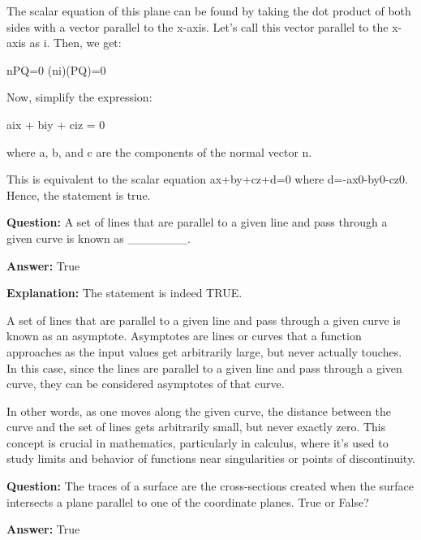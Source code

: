 \documentclass{article}
\begin{document}
The scalar equation of this plane can be found by taking the dot product of both sides with a vector parallel to the x-axis. Let's call this vector parallel to the x-axis as i. Then, we get:

n{\textperiodcentered}PQ{\textrightarrow}=0
(n{\textperiodcentered}i){\textbullet}(PQ{\textrightarrow})=0

Now, simplify the expression:

ai{\textperiodcentered}x + bi{\textperiodcentered}y + ci{\textperiodcentered}z = 0

where a, b, and c are the components of the normal vector n.

This is equivalent to the scalar equation ax+by+cz+d=0 where d=-ax0-by0-cz0. Hence, the statement is true.
                
                \vspace{0.5cm} 
        
            
                \textbf {Question:} A set of lines that are parallel to a given line and pass through a given curve is known as \_\_\_\_\_\_\_.
                
                \textbf{Answer:} True

                \textbf{Explanation:} The statement is indeed TRUE.

A set of lines that are parallel to a given line and pass through a given curve is known as an asymptote. Asymptotes are lines or curves that a function approaches as the input values get arbitrarily large, but never actually touches. In this case, since the lines are parallel to a given line and pass through a given curve, they can be considered asymptotes of that curve.

In other words, as one moves along the given curve, the distance between the curve and the set of lines gets arbitrarily small, but never exactly zero. This concept is crucial in mathematics, particularly in calculus, where it's used to study limits and behavior of functions near singularities or points of discontinuity.
                
                \vspace{0.5cm} 
        
            
                \textbf {Question:} The traces of a surface are the cross-sections created when the surface intersects a plane parallel to one of the coordinate planes. True or False?
                
                \textbf{Answer:} True
\end{document}
